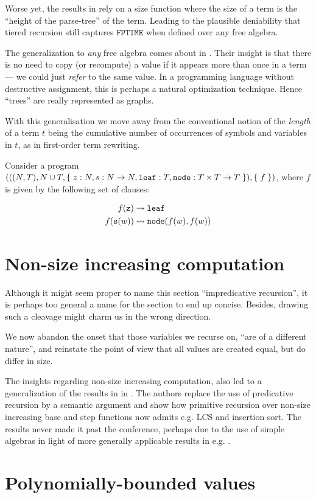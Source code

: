 Worse yet, the results in \cite{leivant-1995} rely on a size function where the
size of a term is the ``height of the parse-tree'' of the term. Leading to the
plausible deniability that tiered recursion still captures $\mathtt{FPTIME}$
when defined over any free algebra\cite{caseiro-1996}.

The generalization to \emph{any} free algebra comes about in
\cite{dal-lago-et-al-2010}. Their insight is that there is no need to copy (or
recompute) a value if it appears more than once in a term --- we could just
\emph{refer} to the same value. In a programming language without destructive
assignment, this is perhaps a natural optimization technique. Hence ``trees''
are really represented as graphs.

\begin{remark} With this generalisation we move away from the conventional
notion of the \emph{length} of a term $t$ being the cumulative number of
occurrences of symbols and variables in $t$, as in first-order term
rewriting\cite{klop-vrijer-2003}. \end{remark}

\begin{example} \cite{dal-lago-et-al-2003} Consider a program ${\mathopen{}\left({{\mathopen{}\left({{\mathopen{}\left({N,T}\right)\mathclose{}}, N
\cup T, \mathopen{}\left\{\mathrel{}{z : N, s : N \rightarrow N, \mathtt{leaf} : T, \mathtt{node} : T
\times T \rightarrow T}\mathrel{}\right\}\mathclose{}}\right)\mathclose{}}, \mathopen{}\left\{\mathrel{}{f}\mathrel{}\right\}\mathclose{}}\right)\mathclose{}}$, where $f$ is given by the following set of
clauses:

\begin{align}
f{\mathopen{}\left({\mathtt{z}}\right)\mathclose{}}       &\leadsto \mathtt{leaf} \\
f{\mathopen{}\left({\mathtt{s}{\mathopen{}\left({w}\right)\mathclose{}}}\right)\mathclose{}}  &\leadsto \mathtt{node}{\mathopen{}\left({f{\mathopen{}\left({w}\right)\mathclose{}}, f{\mathopen{}\left({w}\right)\mathclose{}}}\right)\mathclose{}}
\end{align}

\end{example}

\section{Non-size increasing computation}

Although it might seem proper to name this section ``impredicative recursion'',
it is perhaps too general a name for the section to end up concise. Besides,
drawing such a cleavage might charm us in the wrong direction.

We now abandon the onset that those variables we recurse on, ``are of a
different nature'', and reinstate the point of view that all values are created
equal, but do differ in size.

The insights regarding non-size increasing computation, also led to a
generalization of the results in \cite{marion-2003} in
\cite{marion-moyen-2000}. The authors replace the use of predicative recursion
by a semantic argument and show how primitive recursion over non-size
increasing base and step functions now admits e.g. LCS and insertion sort. The
results never made it past the conference, perhaps due to the use of simple
algebras in light of more generally applicable results in e.g.
\cite{aehlig-schwichtenberg-2002, hofmann-2003}.

\section{Polynomially-bounded values}
